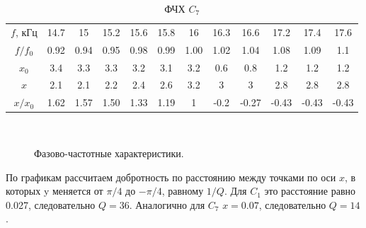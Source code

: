 \documentclass{physlab}
\begin{document}
\begin{table}[H]
	\centering
	\caption{ФЧХ $C_7$}
	\label{table3.2}
	\begin{tabular}{c|c|c|c|c|c|c|c|c|c|c|c}
		\toprule
		$f$, кГц & 14.7 & 15 & 15.2 & 15.6 & 15.8 & 16 & 16.3 & 16.6 & 17.2 & 17.4 & 17.6 \\ 
		$f/f_0$ & 0.92 & 0.94 & 0.95 & 0.98 & 0.99 & 1.00 & 1.02 & 1.04 & 1.08 & 1.09 & 1.1 \\ 
		$x_0$ & 3.4 & 3.3 & 3.3 & 3.2 & 3.1 & 3.2 & 0.6 & 0.8 & 1.2 & 1.2 & 1.2 \\ 
		$x$ & 2.1 & 2.1 & 2.2 & 2.4 & 2.6 & 3.2 & 3 & 3 & 2.8 & 2.8 & 2.8 \\ 
		$x/x_0$ & 1.62 & 1.57 & 1.50 & 1.33 & 1.19 & 1 & -0.2 & -0.27 & -0.43 & -0.43 & -0.43 \\ \bottomrule
	\end{tabular}
\end{table}

\begin{figure}[H]
	\begin{minipage}[H]{0.49\linewidth}
	\end{minipage}
	~
	\begin{minipage}[h]{0.49\linewidth}
	\end{minipage}
	\caption{Фазово-частотные характеристики.}
	\label{ris:image4}
\end{figure}
По графикам рассчитаем добротность по расстоянию между точками по оси $x$, в которых y меняется от $\pi/4$ до $-\pi/4$, равному $1/Q$. Для $C_1$ это расстояние равно 0.027, следовательно $Q=36$. Аналогично для $C_7$ $x=0.07$, следовательно $Q=14$. 	
\end{document}
